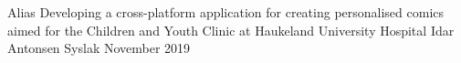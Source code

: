 \documentclass[a4paper, 11pt]{report}
\begin{document}
    \maketitlepage
        {Alias}
        {Developing a cross-platform application for creating personalised comics aimed for the Children and Youth Clinic at Haukeland University Hospital}
        {Idar Antonsen Syslak}
        {November 2019}
    
    
    
    
    
    \tableofcontents
    \listoffigures
    \listoftables
    
    
    
    
    
    
    
    
    
    
    
    
    \printbibliography
    
    \appendix
\end{document}
